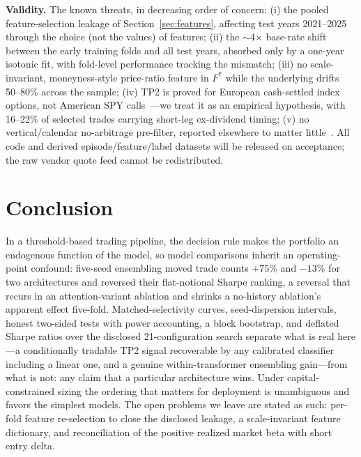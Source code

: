 \documentclass[sigconf,review,anonymous]{acmart}
\begin{document}
\noindent\textbf{Validity.} The known threats, in decreasing order of concern: (i) the pooled feature-selection leakage of Section~\ref{sec:features}, affecting test years 2021--2025 through the choice (not the values) of features; (ii) the $\sim$4$\times$ base-rate shift between the early training folds and all test years, absorbed only by a one-year isotonic fit, with fold-level performance tracking the mismatch; (iii) no scale-invariant, moneyness-style price-ratio feature in $F^{\ast}$ while the underlying drifts 50--80\% across the sample; (iv) TP2 is proved for European cash-settled index options, not American SPY calls~\cite{glasserman2026tp2theory,cosma2020earlyexercise}---we treat it as an empirical hypothesis, with 16--22\% of selected trades carrying short-leg ex-dividend timing; (v) no vertical/calendar no-arbitrage pre-filter, reported elsewhere to matter little~\cite{glasserman2025tp2}. All code and derived episode/feature/label datasets will be released on acceptance; the raw vendor quote feed cannot be redistributed.

\section{Conclusion}
In a threshold-based trading pipeline, the decision rule makes the portfolio an endogenous function of the model, so model comparisons inherit an operating-point confound: five-seed ensembling moved trade counts $+75\%$ and $-13\%$ for two architectures and reversed their flat-notional Sharpe ranking, a reversal that recurs in an attention-variant ablation and shrinks a no-history ablation's apparent effect five-fold. Matched-selectivity curves, seed-dispersion intervals, honest two-sided tests with power accounting, a block bootstrap, and deflated Sharpe ratios over the disclosed 21-configuration search separate what is real here---a conditionally tradable TP2 signal recoverable by any calibrated classifier including a linear one, and a genuine within-transformer ensembling gain---from what is not: any claim that a particular architecture wins. Under capital-constrained sizing the ordering that matters for deployment is unambiguous and favors the simplest models. The open problems we leave are stated as such: per-fold feature re-selection to close the disclosed leakage, a scale-invariant feature dictionary, and reconciliation of the positive realized market beta with short entry delta.
\end{document}
